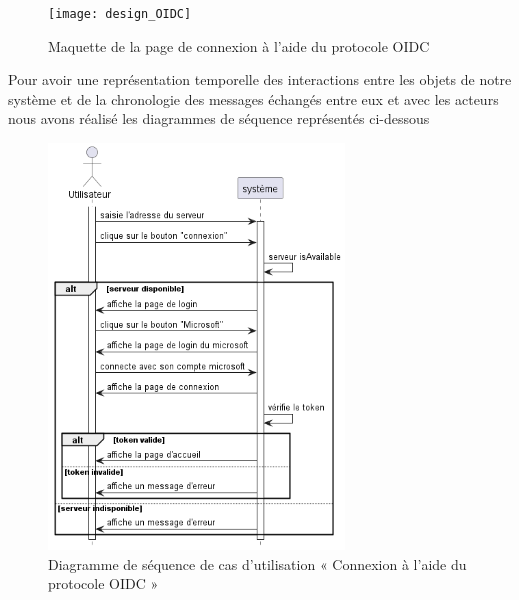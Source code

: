 \begin{figure}[H]
  \centering
  \texttt{[image: design\_OIDC]}
  \caption{Maquette de la page de connexion à l'aide du protocole OIDC}
  \label{fig:design_OIDC}
\end{figure}


Pour avoir une représentation temporelle des interactions entre les objets de notre système et de la chronologie des messages échangés entre eux et avec les acteurs nous avons réalisé les diagrammes de séquence représentés ci-dessous

\begin{figure}[H]
  \centering
  \includegraphics[width=0.7\textwidth]{out/diagrams/sprint5/auth_OIDC/auth_OIDC}
  \caption{Diagramme de séquence de cas d'utilisation « Connexion à l'aide du protocole OIDC »}
  \label{fig:sequence_auth_OIDC}
\end{figure}


